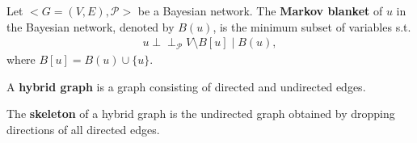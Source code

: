 \begin{definition}
\label{def:mb}
Let $<G=(V,E),\mathcal{P}>$ be a Bayesian network. The \textbf{Markov blanket} of $u$ in the Bayesian network, denoted by $B(u)$, is the minimum subset of variables s.t. 
\begin{align*}
u \!\perp\!\!\!\perp_{\mathcal{P}} V\setminus B[u] \mid B(u),
\end{align*}
where $B[u]=B(u)\cup \{u\}$.
\end{definition}

\begin{definition}
\label{def:hybrid_g}
A \textbf{hybrid graph} is a graph consisting of directed and undirected edges. 
\end{definition}

\begin{definition}
\label{def:skeleton}
The \textbf{skeleton} of a hybrid graph is the undirected graph obtained by dropping directions of all directed edges. 
\end{definition} 

